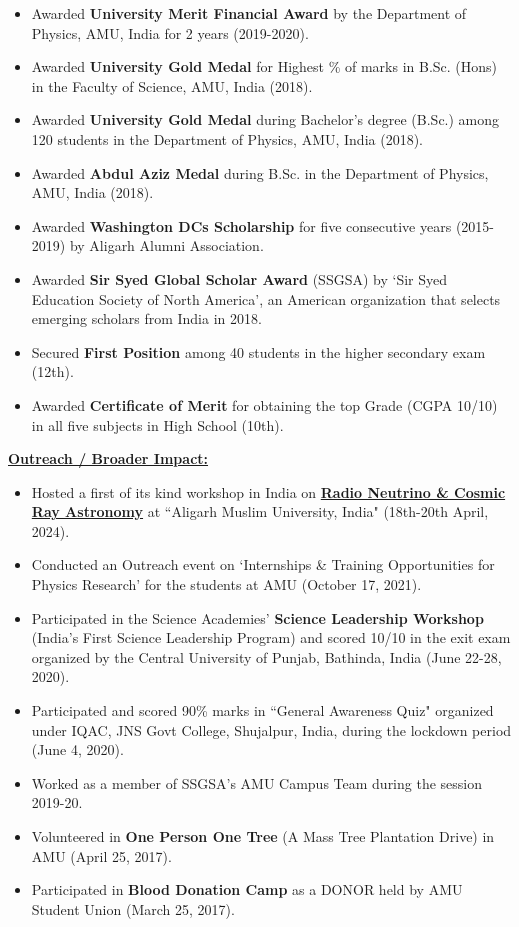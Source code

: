 \documentclass[10pt]{report}
\begin{document}
\begin{itemize}
\item Awarded \textbf{University Merit Financial Award} by the Department of Physics, AMU, India for 2 years (2019-2020).
\item Awarded \textbf{University Gold Medal} for Highest \% of marks in B.Sc. (Hons) in the Faculty of Science, AMU, India (2018).
\item Awarded \textbf{University Gold Medal} during Bachelor's degree (B.Sc.) among 120 students in the Department of Physics, AMU, India (2018).
\item Awarded \textbf{Abdul Aziz Medal} during B.Sc. in the Department of Physics, AMU, India (2018).
\item Awarded \textbf{Washington DCs Scholarship} for five consecutive years (2015-2019) by Aligarh Alumni Association.
\item  Awarded \textbf{Sir Syed Global Scholar Award} (SSGSA) by ‘Sir Syed Education Society of North America’, an American organization that selects emerging scholars from India in 2018.
\item Secured \textbf{First Position} among 40 students in the higher secondary exam (12th).
\item Awarded \textbf{Certificate of Merit} for obtaining the top Grade (CGPA 10/10) in all five subjects in High School (10th).
\end{itemize}
\begin{large}\vspace{2mm}
\textbf{\underline{Outreach / Broader Impact:}}\end{large}
\begin{itemize}
\item Hosted a first of its kind workshop in India on \href{https://indico.ku.edu/event/388/overview}{\bf Radio Neutrino \& Cosmic Ray Astronomy}  at ``Aligarh Muslim University, India"  (18th-20th April, 2024).
\item Conducted an Outreach event on `Internships \& Training Opportunities for Physics Research' for the students at AMU (October 17, 2021).
\item Participated in the Science Academies' \textbf{Science Leadership Workshop} (India's First Science Leadership Program) and scored 10/10 in the exit exam organized by the Central University of Punjab, Bathinda, India (June 22-28, 2020).
\item Participated and scored 90\% marks in ``General Awareness Quiz" organized under IQAC, JNS Govt College, Shujalpur, India, during the lockdown period (June 4, 2020).
\item Worked as a member of SSGSA's AMU Campus Team during the session 2019-20.
\item Volunteered in \textbf{One Person One Tree} (A Mass Tree Plantation Drive) in AMU (April 25, 2017).
\item Participated in \textbf{Blood Donation Camp} as a DONOR held by AMU Student Union (March 25, 2017).
\end{itemize}
\end{document}
